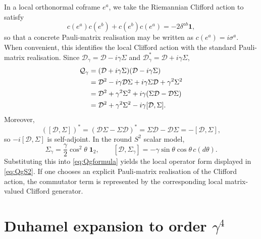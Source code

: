 \documentclass[11pt,a4paper]{article}
\numberwithin{equation}{section}
\theoremstyle{definition}
\newcommand{\cD}{\mathcal{D}}
\newcommand{\Qg}{\mathcal{Q}_\gamma}
\newcommand{\Dg}{\mathcal{D}_\gamma}
\newcommand{\Sig}{\Sigma}
\begin{document}
In a local orthonormal coframe $e^a$, we take the Riemannian Clifford
action to satisfy
\begin{equation}
c(e^a)c(e^b)+c(e^b)c(e^a)=-2\delta^{ab}\mathbf{1},
\end{equation}
so that a concrete Pauli-matrix realisation may be written as
$c(e^a)=i\sigma^a$. When convenient, this identifies the local Clifford
action with the standard Pauli-matrix realisation. Since
$\Dg=\cD-i\gamma\Sig$ and $\Dg^*=\cD+i\gamma\Sig$,
\begin{align}
\Qg&=(\cD+i\gamma\Sig)(\cD-i\gamma\Sig)\notag\\
&=\cD^2-i\gamma\cD\Sig+i\gamma\Sig\cD+\gamma^2\Sig^2\notag\\
&=\cD^2+\gamma^2\Sig^2+i\gamma(\Sig\cD-\cD\Sig)\notag\\
&=\cD^2+\gamma^2\Sig^2-i\gamma[\cD,\Sig].
\end{align}
Moreover,
\begin{equation}
([\cD,\Sig])^*= (\cD\Sig-\Sig\cD)^*=\Sig\cD-\cD\Sig=-[\cD,\Sig],
\end{equation}
so $-i[\cD,\Sig]$ is self-adjoint. In the round $S^2$ scalar model,
\begin{equation}
\Sig_\gamma=\frac{\gamma}{2}\cos^2\!\theta\;\mathbf{1}_2,
\qquad
[\cD,\Sig_\gamma]=-\gamma\sin\theta\cos\theta\,c(d\theta).
\end{equation}
Substituting this into \eqref{eq:Qgformula} yields the local operator form
displayed in \eqref{eq:QgS2}. If one chooses an explicit Pauli-matrix
realisation of the Clifford action, the commutator term is represented by
the corresponding local matrix-valued Clifford generator.

\section{Duhamel expansion to order $\gamma^4$}
\label{app:duhamel}
\end{document}
